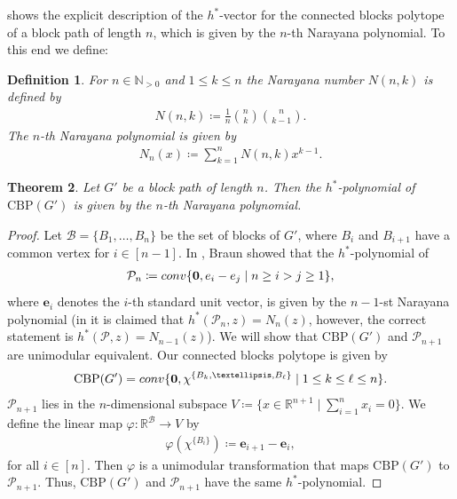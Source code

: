 \documentclass[12pt]{amsart}
\newtheorem{theorem}{Theorem}[section]
\newtheorem{definition}[theorem]{Definition}
\newcommand{\N}{\mathbb{N}}
\newcommand{\R}{\mathbb{R}}
\newcommand{\conv}{\mathop{\rm conv}\nolimits}
\newcommand{\CBP}{\mathrm{CBP}}
\renewcommand{\P}{\mathcal{P}}
\newcommand{\B}{\mathcal{B}}
\begin{document}
 shows the explicit description of the $h^\ast$-vector for the connected blocks polytope of a block path of length $n$, which is given by the $n$-th Narayana polynomial. To this end we define:

\begin{definition}
    For $n \in \N_{>0}$ and $1 \le k \le n$ the Narayana number $N(n,k)$ is defined by
    \begin{align*}
        N(n,k)\coloneqq \frac{1}{n}\binom{n}{k}\binom{n}{k-1}.
    \end{align*}
    The $n$-th Narayana polynomial is given by
    \begin{align*}
        N_n(x) \coloneqq \sum_{k=1}^n N(n,k)x^{k-1}.
    \end{align*}
\end{definition}

\begin{theorem}
    \label{Narayana}
    Let $G'$ be a block path of length $n$. Then the $h^\ast$-polynomial of $\CBP(G')$ is given by the $n$-th Narayana polynomial.
\end{theorem}

\begin{proof}
    Let $\B=\{B_1,\ldots,B_n\}$ be the set of blocks of $G'$, where $B_i$ and $B_{i+1}$ have a common vertex for $i \in [n-1]$. In \cite{Braun15}, Braun showed that the $h^\ast$-polynomial of
    \begin{align*}
        \P_n \coloneqq \conv\{\mathbf{0},\textbf{e}_i-\textbf{e}_j \mid n \ge i > j \ge 1\},
    \end{align*}
    where $\textbf{e}_i$ denotes the $i$-th standard unit vector, is given by the $n-1$-st Narayana polynomial (in \cite{Braun15} it is claimed that $h^\ast(\P_n,z)=N_n(z)$, however, the correct statement is $h^\ast(\P,z)=N_{n-1}(z)$). We will show that $\CBP(G')$ and $\P_{n+1}$ are unimodular equivalent. Our connected blocks polytope is given by
    \begin{align*}
        \CBP(G')=\conv\{\mathbf{0}, \chi^{\{B_k,\ldots,B_\ell\}} \mid 1 \le k \le \ell \le n\}.
    \end{align*}
    $\P_{n+1}$ lies in the $n$-dimensional subspace $V \coloneqq \{x \in \R^{n+1} \mid \sum_{i=1}^n x_i=0\}$. We define the linear map $\varphi \colon \R^\B \to V$ by
    \begin{align*}
        \varphi(\chi^{\{B_i\}})\coloneqq \textbf{e}_{i+1}-\textbf{e}_i,
    \end{align*}
    for all $i \in [n]$. Then $\varphi$ is a unimodular transformation that maps $\CBP(G')$ to $\P_{n+1}$. Thus, $\CBP(G')$ and $\P_{n+1}$ have the same $h^\ast$-polynomial.
    \end{proof}
\end{document}

